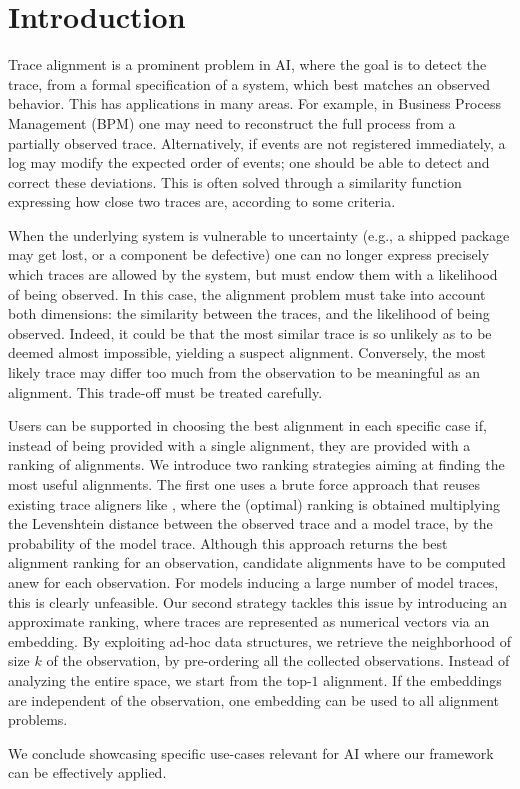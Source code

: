 
\section{Introduction}
\label{introduction}

Trace alignment is a prominent problem in AI, where the goal is to detect the trace, from a formal specification of a system,
which best matches an observed behavior. This has applications in many areas. For example, in Business Process Management (BPM)
one may need to reconstruct the full process from a partially observed trace. Alternatively, if events are not registered immediately,
a log may modify the expected order of events; one should be able to detect and correct these deviations. This is often solved
through a similarity function expressing how close two traces are, according to some criteria.

When the underlying system is vulnerable to uncertainty (e.g., a shipped package may get lost, or a component be defective)
one can no longer express precisely which traces are allowed by the system, but must endow them with a likelihood
of being observed. In this case, the alignment problem must take into account both dimensions: the similarity between the
traces, and the likelihood of being observed. Indeed, it could be that the most similar trace is so unlikely as to be deemed almost
impossible, yielding a suspect alignment. Conversely, the most likely trace may differ too much from the observation to be
meaningful as an alignment. This trade-off must be treated carefully. 

Users can be supported in choosing the best alignment in each specific case if, instead of being provided with a single alignment, they are provided with a ranking of alignments. We introduce two ranking strategies aiming at finding the most useful alignments. The first one uses a brute force approach that reuses existing trace aligners like \cite{DBLP:conf/edoc/AdriansyahDA11,LeoniM17}, where the (optimal) ranking
is obtained multiplying the Levenshtein distance between the observed trace and a model trace, by the probability of the
model trace. Although this approach returns the best alignment ranking for an observation, candidate alignments have to be computed
anew for each observation. For models inducing a large number of model traces, this is clearly unfeasible. Our second
strategy tackles this issue by introducing an approximate ranking, where traces are represented as numerical vectors via an embedding.
By exploiting ad-hoc data structures, we retrieve the neighborhood of size $k$ of the observation, by pre-ordering all the collected observations. Instead of analyzing the entire space, we start from the top-$1$ alignment. If the embeddings are
independent of the observation, one embedding can be used to all alignment problems.

We conclude showcasing specific use-cases relevant for AI where our framework can be effectively applied. 